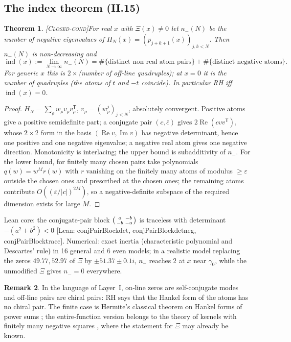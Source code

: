 \documentclass[11pt]{amsart}
\theoremstyle{plain}
\newtheorem{theorem}{Theorem}[section]
\theoremstyle{definition}
\newtheorem{remark}[theorem]{Remark}
\newcommand{\ind}{\operatorname{ind}}
\newcommand{\status}[1]{\textsc{[#1]}}
\newcommand{\leanus}{\textunderscore\allowbreak}
\newcommand{\lean}[1]{{\ttfamily\let\_\leanus #1}}
\begin{document}
\subsection{The index theorem (II.15)}
\begin{theorem}\status{Closed-cond}\label{thm:index}
For real $x$ with $\Xi(x)\ne0$ let $n_-(N)$ be the number of negative eigenvalues of
$H_N(x)=(p_{j+k+1}(x))_{j,k<N}$. Then $n_-(N)$ is non-decreasing and
\[
\ind(x):=\lim_{N\to\infty}n_-(N)=\#\{\text{distinct non-real atom pairs}\}+\#\{\text{distinct negative atoms}\}.
\]
For generic $x$ this is $2\times$(number of off-line quadruples); at $x=0$ it is the
number of quadruples (the atoms of $t$ and $-t$ coincide). In particular RH iff $\ind(x)=0$.
\end{theorem}
\begin{proof}
$H_N=\sum_\rho w_\rho v_\rho v_\rho^{\mathsf T}$, $v_\rho=(w_\rho^j)_{j<N}$, absolutely
convergent. Positive atoms give a positive semidefinite part; a conjugate pair $(c,\bar c)$
gives $2\operatorname{Re}(cvv^{\mathsf T})$, whose $2\times2$ form in the basis
$(\operatorname{Re}v,\operatorname{Im}v)$ has negative determinant, hence one positive and
one negative eigenvalue; a negative real atom gives one negative direction.
Monotonicity is interlacing; the upper bound is subadditivity of $n_-$. For the lower bound,
for finitely many chosen pairs take polynomials $q(w)=w^Mr(w)$ with $r$ vanishing on the
finitely many atoms of modulus $\ge\varepsilon$ outside the chosen ones and prescribed at the
chosen ones; the remaining atoms contribute $O((\varepsilon/|c|)^{2M})$, so a negative-definite
subspace of the required dimension exists for large $M$.
\end{proof}
\noindent Lean core: the conjugate-pair block $\begin{psmallmatrix}a&-b\\-b&-a\end{psmallmatrix}$ is
traceless with determinant $-(a^2+b^2)<0$
\lean{[Lean: conjPairBlock\_det, conjPairBlock\_det\_neg, conjPairBlock\_trace]}.
Numerical: exact inertia (characteristic polynomial and Descartes' rule) in 16 general and 6 even
models; in a realistic model replacing the zeros $49.77, 52.97$ of $\Xi$ by $\pm51.37\pm0.1i$,
$n_-$ reaches $2$ at $x$ near $\gamma_0$, while the unmodified $\Xi$ gives $n_-=0$ everywhere.

\begin{remark}
In the language of Layer~I, on-line zeros are self-conjugate modes and off-line pairs are
chiral pairs: RH says that the Hankel form of the atoms has no chiral pair. The finite case is
Hermite's classical theorem on Hankel forms of power sums \cite{KreinNaimark}; the entire-function
version belongs to the theory of kernels with finitely many negative squares
\cite{Stewart,KaltenbackWoracek}, where the statement for $\Xi$ may already be known.
\end{remark}
\end{document}
